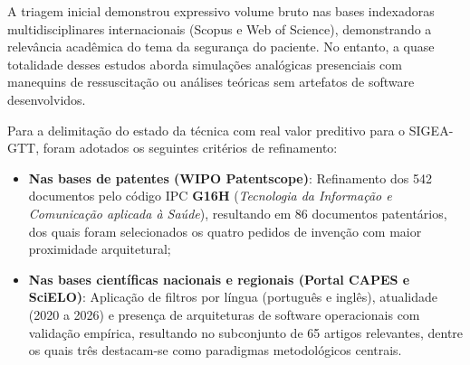 A triagem inicial demonstrou expressivo volume bruto nas bases indexadoras multidisciplinares internacionais (Scopus e Web of Science), demonstrando a relevância acadêmica do tema da segurança do paciente. No entanto, a quase totalidade desses estudos aborda simulações analógicas presenciais com manequins de ressuscitação ou análises teóricas sem artefatos de software desenvolvidos.

Para a delimitação do estado da técnica com real valor preditivo para o SIGEA-GTT, foram adotados os seguintes critérios de refinamento:
\begin{itemize}
    \item \textbf{Nas bases de patentes (WIPO Patentscope)}: Refinamento dos 542 documentos pelo código IPC \textbf{G16H} (\textit{Tecnologia da Informação e Comunicação aplicada à Saúde}), resultando em 86 documentos patentários, dos quais foram selecionados os quatro pedidos de invenção com maior proximidade arquitetural;
    \item \textbf{Nas bases científicas nacionais e regionais (Portal CAPES e SciELO)}: Aplicação de filtros por língua (português e inglês), atualidade (2020 a 2026) e presença de arquiteturas de software operacionais com validação empírica, resultando no subconjunto de 65 artigos relevantes, dentre os quais três destacam-se como paradigmas metodológicos centrais.
\end{itemize}
